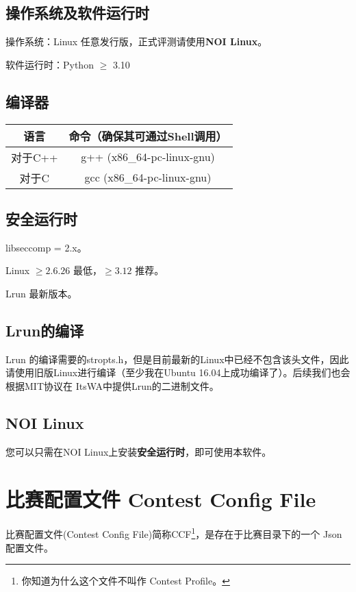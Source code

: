 \documentclass[UTF8]{ctexart}
\newcommand{\itswa}{ItsWA}
\begin{document}
        \subsection{操作系统及软件运行时}
            操作系统：Linux 任意发行版，正式评测请使用\textbf{NOI Linux}。

            软件运行时：Python $\geq$ 3.10

        \subsection{编译器}
            \begin{tabular}{|c|c|}
                \hline
                \textbf{语言} & \textbf{命令（确保其可通过Shell调用）} \\
                \hline
                对于C++ & g++ (x86\_64-pc-linux-gnu) \\
                \hline
                对于C & gcc \space \space (x86\_64-pc-linux-gnu) \\
                \hline
            \end{tabular}

        \subsection{安全运行时}
            libseccomp = 2.x。

            Linux $\ge 2.6.26$ 最低，$\ge 3.12$ 推荐。

            Lrun 最新版本。

        \subsection{Lrun的编译}
            Lrun 的编译需要的stropts.h，但是目前最新的Linux中已经不包含该头文件，因此请使用旧版Linux进行编译（至少我在Ubuntu 16.04上成功编译了）。后续我们也会根据MIT协议在 \itswa 中提供Lrun的二进制文件。
        
        \subsection{NOI Linux}
            您可以只需在NOI Linux上安装\textbf{安全运行时}，即可使用本软件。
    
    \section{比赛配置文件 Contest Config File}
        比赛配置文件(Contest Config File)简称CCF\footnote{你知道为什么这个文件不叫作 Contest Profile。}，是存在于比赛目录下的一个 Json 配置文件。
\end{document}

